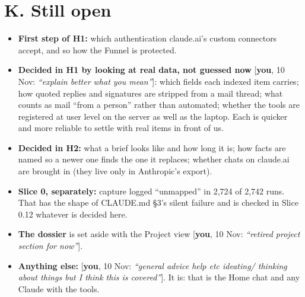 \documentclass[10pt]{extarticle}
\newcommand{\you}[2]{{\small[\textbf{you}, #1: \textit{``#2''}]}}
\newcommand{\Sec}[1]{\section*{#1}\addcontentsline{toc}{section}{#1}}
\begin{document}
\Sec{K. Still open}
\begin{itemize}
\item \textbf{First step of H1:} which authentication claude.ai's custom connectors accept, and so how the Funnel is protected.
\item \textbf{Decided in H1 by looking at real data, not guessed now} \you{10 Nov}{explain better what you mean}: which fields each indexed item carries; how quoted replies and signatures are stripped from a mail thread; what counts as mail ``from a person'' rather than automated; whether the tools are registered at user level on the server as well as the laptop. Each is quicker and more reliable to settle with real items in front of us.
\item \textbf{Decided in H2:} what a brief looks like and how long it is; how facts are named so a newer one finds the one it replaces; whether chats on claude.ai are brought in (they live only in Anthropic's export).
\item \textbf{Slice 0, separately:} capture logged ``unmapped'' in 2,724 of 2,742 runs. That has the shape of CLAUDE.md \S3's silent failure and is checked in Slice 0.12 whatever is decided here.
\item \textbf{The dossier} is set aside with the Project view \you{10 Nov}{retired project section for now}.
\item \textbf{Anything else:} \you{10 Nov}{general advice help etc ideating/ thinking about things but I think this is covered}. It is: that is the Home chat and any Claude with the tools.
\end{itemize}
\end{document}
